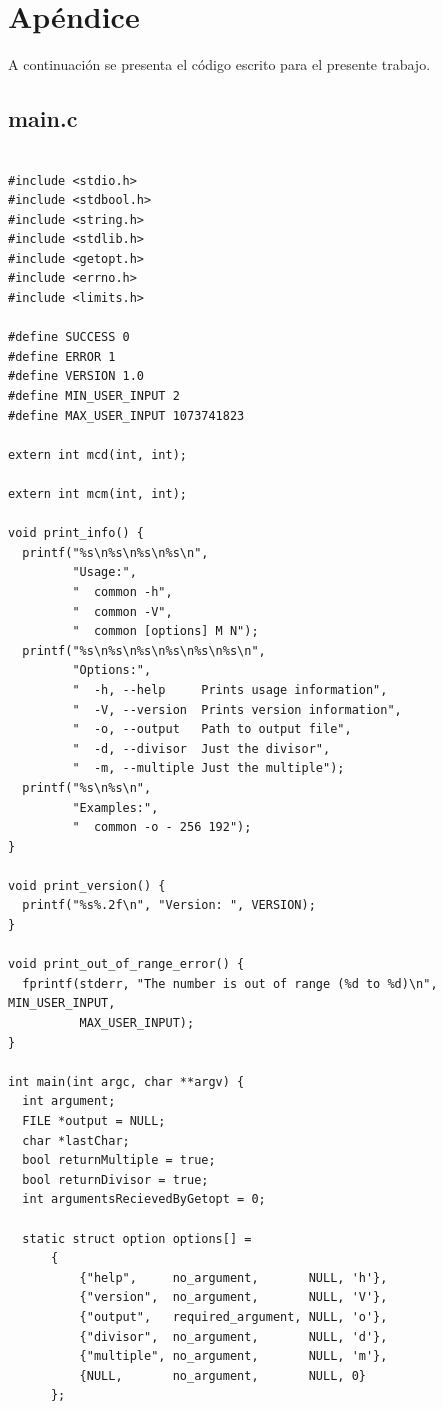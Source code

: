 \documentclass[a4paper,10pt]{article}
\begin{document}
\section{Apéndice}
A continuación se presenta el código escrito para el presente trabajo.\\

\subsection{main.c}
  \begin{verbatim}

#include <stdio.h>
#include <stdbool.h>
#include <string.h>
#include <stdlib.h>
#include <getopt.h>
#include <errno.h>
#include <limits.h>

#define SUCCESS 0
#define ERROR 1
#define VERSION 1.0
#define MIN_USER_INPUT 2
#define MAX_USER_INPUT 1073741823

extern int mcd(int, int);

extern int mcm(int, int);

void print_info() {
  printf("%s\n%s\n%s\n%s\n",
         "Usage:",
         "  common -h",
         "  common -V",
         "  common [options] M N");
  printf("%s\n%s\n%s\n%s\n%s\n%s\n",
         "Options:",
         "  -h, --help     Prints usage information",
         "  -V, --version  Prints version information",
         "  -o, --output   Path to output file",
         "  -d, --divisor  Just the divisor",
         "  -m, --multiple Just the multiple");
  printf("%s\n%s\n",
         "Examples:",
         "  common -o - 256 192");
}

void print_version() {
  printf("%s%.2f\n", "Version: ", VERSION);
}

void print_out_of_range_error() {
  fprintf(stderr, "The number is out of range (%d to %d)\n", MIN_USER_INPUT,
          MAX_USER_INPUT);
}

int main(int argc, char **argv) {
  int argument;
  FILE *output = NULL;
  char *lastChar;
  bool returnMultiple = true;
  bool returnDivisor = true;
  int argumentsRecievedByGetopt = 0;

  static struct option options[] =
      {
          {"help",     no_argument,       NULL, 'h'},
          {"version",  no_argument,       NULL, 'V'},
          {"output",   required_argument, NULL, 'o'},
          {"divisor",  no_argument,       NULL, 'd'},
          {"multiple", no_argument,       NULL, 'm'},
          {NULL,       no_argument,       NULL, 0}
      };


\end{verbatim}
\end{document}
